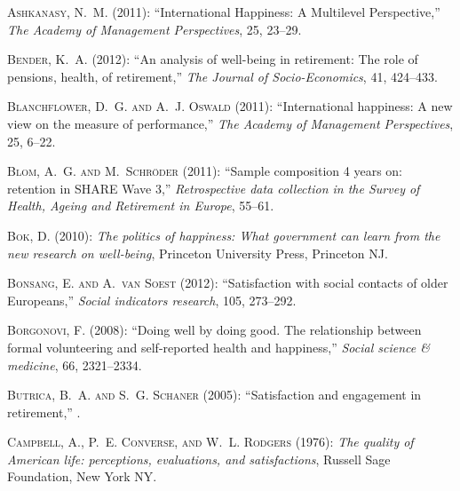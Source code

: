 \textsc{Ashkanasy, N.~M.} (2011): \enquote{International Happiness: A
  Multilevel Perspective,} \emph{The Academy of Management Perspectives}, 25,
  23--29.

\textsc{Bender, K.~A.} (2012): \enquote{An analysis of well-being in
  retirement: The role of pensions, health, of retirement,} \emph{The Journal
  of Socio-Economics}, 41, 424--433.

\textsc{Blanchflower, D.~G. and A.~J. Oswald} (2011): \enquote{International
  happiness: A new view on the measure of performance,} \emph{The Academy of
  Management Perspectives}, 25, 6--22.

\textsc{Blom, A.~G. and M.~Schr{\"o}der} (2011): \enquote{Sample composition 4
  years on: retention in SHARE Wave 3,} \emph{Retrospective data collection in
  the Survey of Health, Ageing and Retirement in Europe}, 55--61.

\textsc{Bok, D.} (2010): \emph{The politics of happiness: What government can
  learn from the new research on well-being}, Princeton University Press,
  Princeton NJ.

\textsc{Bonsang, E. and A.~van Soest} (2012): \enquote{Satisfaction with social
  contacts of older Europeans,} \emph{Social indicators research}, 105,
  273--292.

\textsc{Borgonovi, F.} (2008): \enquote{Doing well by doing good. The
  relationship between formal volunteering and self-reported health and
  happiness,} \emph{Social science \& medicine}, 66, 2321--2334.

\textsc{Butrica, B.~A. and S.~G. Schaner} (2005): \enquote{Satisfaction and
  engagement in retirement,} .

\textsc{Campbell, A., P.~E. Converse, and W.~L. Rodgers} (1976): \emph{The
  quality of American life: perceptions, evaluations, and satisfactions},
  Russell Sage Foundation, New York NY.

